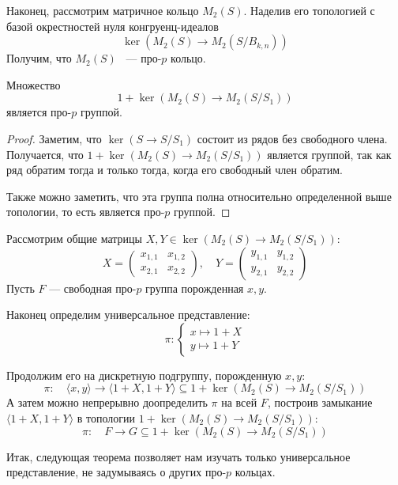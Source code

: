 Наконец, рассмотрим матричное кольцо $M_2(S)$.
Наделив его топологией с базой окрестностей нуля конгруенц-идеалов
\[
    \ker{(M_2(S) \to M_2(S / B_{k,n}))}
\]
Получим, что $M_2(S)$ ~--- про-$p$ кольцо.
\vskip 0.1in\noindent
\begin{proposition}
    Множество
    \[1 + \ker{(M_2(S) \to M_2(S / S_1))}\]
    является про-$p$ группой.
\end{proposition}
\begin{proof}
    Заметим, что $\ker{(S\to S/S_1)}$ состоит из рядов без свободного члена.
    Получается, что $1 + \ker{(M_2(S) \to M_2(S / S_1))}$ является группой, так как ряд обратим тогда и только тогда, когда его свободный член обратим.

    Также можно заметить, что эта группа полна относительно определенной выше топологии, то есть является про-$p$ группой.
\end{proof}
Рассмотрим общие матрицы $X, Y \in \ker{(M_2(S) \to M_2(S / S_1))}$:
\[
    X=
    \begin{pmatrix}
        x_{1,1} & x_{1,2} \\
        x_{2,1} & x_{2,2}
    \end{pmatrix},
    \quad
    Y=
    \begin{pmatrix}
        y_{1,1} & y_{1,2} \\
        y_{2,1} & y_{2,2}
    \end{pmatrix}
\]
Пусть $F$ --- свободная про-$p$ группа порожденная $x, y$.

Наконец определим универсальное представление:
\[
    \pi:
    \left\{
    \begin{array}{l}
        x \mapsto 1 + X \\
        y \mapsto 1 + Y
    \end{array}
    \right.
\]

Продолжим его на дискретную подгруппу, порожденную $x, y$:
\[
    \pi: \quad \langle x, y \rangle \to \langle 1+X, 1+Y \rangle \subseteq 1 + \ker{(M_2(S) \to M_2(S / S_1))}
\]
А затем можно непрерывно доопределить $\pi$ на всей $F$, построив замыкание $\langle 1+X, 1+Y \rangle$ в топологии $1 + \ker{(M_2(S) \to M_2(S / S_1))}$:
\[
    \pi:\quad F \to G \subseteq 1 + \ker{(M_2(S) \to M_2(S / S_1))}
\]

Итак, следующая теорема позволяет нам изучать только универсальное представление, не задумываясь о других про-$p$ кольцах.

